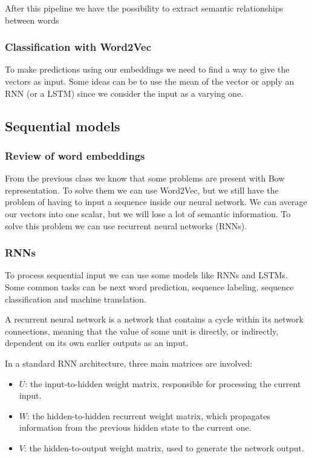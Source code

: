 After this pipeline we have the possibility to extract semantic relationships between words

\subsubsection{Classification with Word2Vec}

To make predictions using our embeddings we need to find a way to give the vectors as input. Some ideas can be to use the mean of the vector or apply an RNN (or a LSTM) since we consider the input as a varying one. 

\subsection{Sequential models}


\subsubsection{Review of word embeddings}

From the previous class we know that some problems are present with Bow representation. To solve them we can use Word2Vec, but we still have the problem of having to input a sequence inside our neural network. We can average our vectors into one scalar, but we will lose a lot of semantic information. To solve this problem we can use recurrent neural networks (RNNs).


\subsubsection{RNNs}

To process sequential input we can use some models like RNNs and LSTMs. Some common tasks can be next word prediction, sequence labeling, sequence classification and machine translation. 

\vspace{10pt}

A recurrent neural network is a network that contains a cycle within its network connections, meaning that the value of some unit is directly, or indirectly, dependent on its own earlier outputs as an input. 

In a standard RNN architecture, three main matrices are involved:

\begin{itemize}
    \item $U$: the input-to-hidden weight matrix, responsible for processing the current input.
    
    \item $W$: the hidden-to-hidden recurrent weight matrix, which propagates information
    from the previous hidden state to the current one.
    
    \item $V$: the hidden-to-output weight matrix, used to generate the network output.
\end{itemize}

